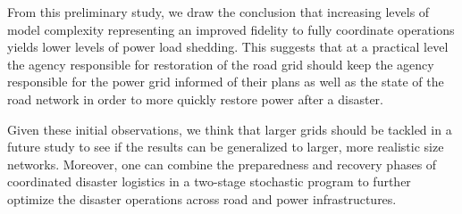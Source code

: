 \documentclass[10pt]{article}
\begin{document}
From this preliminary study, we draw the conclusion that increasing levels of model complexity representing an improved fidelity to fully coordinate operations yields lower levels of power load shedding. This suggests that at a practical level the agency responsible for restoration of the road grid should keep the agency responsible for the power grid informed of their plans as well as the state of the road network in order to more quickly restore power after a disaster.

Given these initial observations, we think that larger grids should be tackled in a future study to see if the results can be generalized to larger, more realistic size networks. Moreover, one can combine the preparedness and recovery phases of coordinated disaster logistics in a two-stage stochastic program to further optimize the disaster operations across road and power infrastructures.



\end{document}
